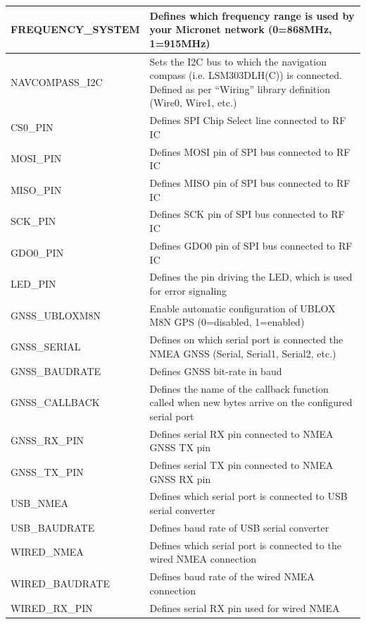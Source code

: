 \documentclass{report}
\begin{document}
\begin{table}[h]
	\begin{tabular}{|l|p{12cm}|}
		\hline
		FREQUENCY\_SYSTEM & Defines which frequency range is used by your Micronet network (0=868MHz, 1=915MHz)\\
		\hline
		NAVCOMPASS\_I2C & Sets the I2C bus to which the navigation compass (i.e. LSM303DLH(C)) is connected. Defined as per “Wiring” library definition (Wire0, Wire1, etc.)\\
		\hline
		CS0\_PIN & Defines SPI Chip Select line connected to RF IC\\
		\hline
		MOSI\_PIN & Defines MOSI pin of SPI bus connected to RF IC\\
		\hline
		MISO\_PIN & Defines MISO pin of SPI bus connected to RF IC\\
		\hline
		SCK\_PIN & Defines SCK pin of SPI bus connected to RF IC\\
		\hline
		GDO0\_PIN & Defines GDO0 pin of SPI bus connected to RF IC\\
		\hline
		LED\_PIN & Defines the pin driving the LED, which is used for error signaling\\
		\hline
		GNSS\_UBLOXM8N & Enable automatic configuration of UBLOX M8N GPS (0=disabled, 1=enabled)\\
		\hline
		GNSS\_SERIAL & Defines on which serial port is connected the NMEA GNSS (Serial, Serial1, Serial2, etc.)\\
		\hline
		GNSS\_BAUDRATE & Defines GNSS bit-rate in baud\\
		\hline
		GNSS\_CALLBACK & Defines the name of the callback function called when new bytes arrive on the
		configured serial port\\
		\hline
		GNSS\_RX\_PIN & Defines serial RX pin connected to NMEA GNSS TX pin\\
		\hline
		GNSS\_TX\_PIN & Defines serial TX pin connected to NMEA GNSS RX pin\\
		\hline
		USB\_NMEA & Defines which serial port is connected to USB serial converter\\
		\hline
		USB\_BAUDRATE & Defines baud rate of USB serial converter\\
		\hline
		WIRED\_NMEA & Defines which serial port is connected to the wired NMEA connection\\
		\hline
		WIRED\_BAUDRATE & Defines baud rate of the wired NMEA connection\\
		\hline
		WIRED\_RX\_PIN & Defines serial RX pin used for wired NMEA\\

\end{tabular}
\end{table}
\end{document}
